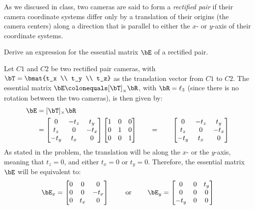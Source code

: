 \begin{problem}
  As we discused in class, two cameras are said to form a \emph{rectified pair}
  if their camera coordinate systems differ only by a translation of their origins
  (the camera centers) along a direction that is parallel to either the $x$- or $y$-axis
  of their coordinate systems.

  \begin{enumroman}
    \item Derive an expression for the essential matrix $\bE$ of a rectified pair.
      \begin{answer}
        Let $C1$ and $C2$ be two rectified pair cameras,
        with $\bT = \bmat{t_x \\ t_y \\ t_z}$ as the translation vector from $C1$ to $C2$.
        The essential matrix $\bE \colonequals [\bT]_\times \bR$, with $\bR = \ell_3$
        (since there is no rotation between the two cameras),
        is then given by:
        \begin{align*}
          \bE &= [\bT]_\times \bR \\
              &= \begin{bmatrix}
                0 & -t_z & t_y \\
                t_z & 0 & -t_x \\
                -t_y & t_x & 0
              \end{bmatrix} \begin{bmatrix}
                1 & 0 & 0 \\
                0 & 1 & 0 \\
                0 & 0 & 1
              \end{bmatrix}
              \qquad = \qquad \begin{bmatrix}
                0 & -t_z & t_y \\
                t_z & 0 & -t_x \\
                -t_y & t_x & 0
              \end{bmatrix}
        \end{align*}
        As stated in the problem, the translation will be along the $x$- or the $y$-axis,
        meaning that $t_z = 0$, and either $t_x = 0$ or $t_y = 0$.
        Therefore, the essential matrix $\bE$ will be equivalent to:
        \begin{align*}
          \bE_x = \begin{bmatrix}
            0 & 0 & 0 \\
            0 & 0 & -t_x \\
            0 & t_x & 0
          \end{bmatrix} \qquad \text{ or } \qquad
          \bE_y = \begin{bmatrix}
            0 & 0 & t_y \\
            0 & 0 & 0 \\
            -t_y & 0 & 0
          \end{bmatrix}
        \end{align*}
      \end{answer}
    

\end{enumroman}
\end{problem}
